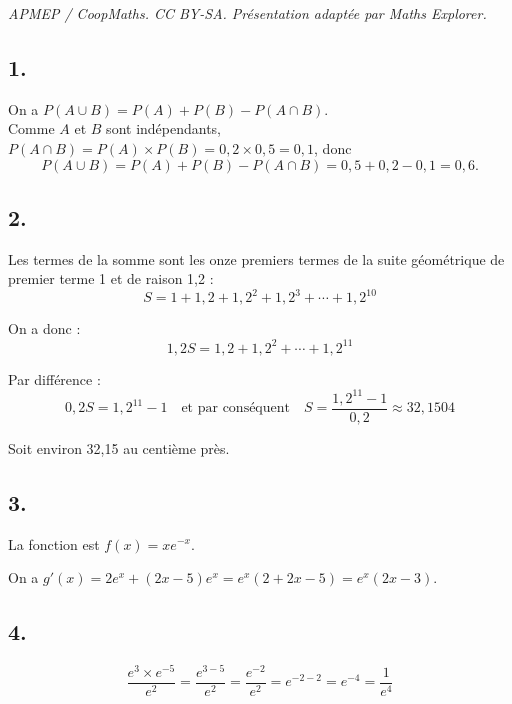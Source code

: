\documentclass[10pt]{article}
\begin{document}
\noindent\textit{APMEP / CoopMaths. CC BY-SA. Présentation adaptée par Maths Explorer.}\par\medskip
\subsection*{1.}
	
	On a \(P(A \cup B) = P(A) + P(B) - P(A \cap B)\). \\
	Comme \(A\) et \(B\) sont indépendants, \(P(A \cap B) = P(A) \times P(B) = 0,2 \times 0,5 = 0,1\), donc
	\[
	P(A \cup B) = P(A) + P(B) - P(A \cap B) = 0,5 + 0,2 - 0,1 = 0,6.
	\]
	
	\subsection*{2.}
	
	Les termes de la somme sont les onze premiers termes de la suite géométrique de premier terme 1 et de raison 1,2 :
	\[
	S = 1 + 1,2 + 1,2^2 + 1,2^3 + \cdots + 1,2^{10}
	\]
	
	On a donc :
	\[
	1,2S = 1,2 + 1,2^2 + \cdots + 1,2^{11}
	\]
	
	Par différence :
	\[
	0,2S = 1,2^{11} - 1 \quad \text{et par conséquent} \quad S = \dfrac{1,2^{11} - 1}{0,2} \approx 32,1504
	\]
	
	Soit environ 32,15 au centième près.
	
	\subsection*{3.}
	
	La fonction est \(f(x) = xe^{-x}\).
	
	On a \(g'(x) = 2e^x + (2x - 5)e^x = e^x(2 + 2x - 5) = e^x(2x - 3)\).
	
	\subsection*{4.}
	
	\[
	\dfrac{e^3 \times e^{-5}}{e^2} = \dfrac{e^{3-5}}{e^2} = \dfrac{e^{-2}}{e^2} = e^{-2-2} = e^{-4} = \dfrac{1}{e^4}
	\]
\end{document}
